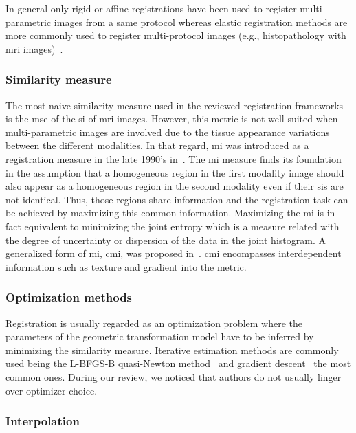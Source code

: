 In general only rigid or affine registrations have been used to register multi-parametric images from a same protocol whereas elastic registration methods are more commonly used to register multi-protocol images (e.g., histopathology with \ac{mri} images)~\cite{Toth2008,Toth2009}.

\subsubsection{Similarity measure}\label{subsubsec:simmea}

The most naive similarity measure used in the reviewed registration frameworks is the \acf{mse} of the \ac{si} of \ac{mri} images. However, this metric is not well suited when multi-parametric images are involved due to the tissue appearance variations between the different modalities.
In that regard, \ac{mi} was introduced as a registration measure in the late 1990's in~\cite{Pluim2003}. The \ac{mi} measure finds its foundation in the assumption that a homogeneous region in the first modality image should also appear as a homogeneous region in the second modality even if their \acp{si} are not identical. Thus, those regions share information and the registration task can be achieved by maximizing this common information. Maximizing the \ac{mi} is in fact equivalent to minimizing the joint entropy which is a measure related with the degree of uncertainty or dispersion of the data in the joint histogram. A generalized form of \ac{mi}, \ac{cmi}, was proposed in~\cite{Chappelow2011}. \ac{cmi} encompasses interdependent information such as texture and gradient into the metric.

\subsubsection{Optimization methods}\label{subsubsec:optmea}

Registration is usually regarded as an optimization problem where the parameters of the geometric transformation model have to be inferred by minimizing the similarity measure. Iterative estimation methods are commonly used being the L-BFGS-B quasi-Newton method~\cite{Byrd1995} and gradient descent~\cite{Viola1997} the most common ones. During our review, we noticed that authors do not usually linger over optimizer choice.

\subsubsection{Interpolation}\label{subsubsec:int}

